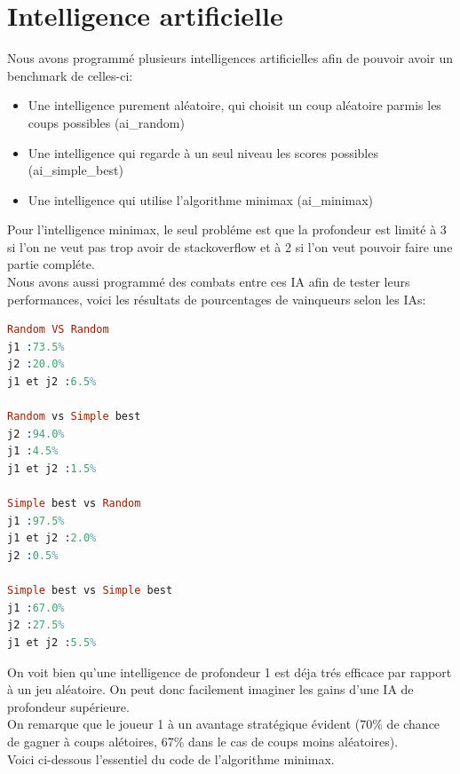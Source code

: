 \documentclass[11pt,a4paper,twoside,french,svgnames]{report}
\begin{document}
\section{Intelligence artificielle}
Nous avons programmé plusieurs intelligences artificielles afin de pouvoir avoir un benchmark de celles-ci:
\begin{itemize}
    \item Une intelligence purement aléatoire, qui choisit un coup aléatoire parmis les coups possibles (ai\_random)
    \item Une intelligence qui regarde à un seul niveau les scores possibles (ai\_simple_best)
    \item Une intelligence qui utilise l'algorithme minimax (ai\_minimax)
\end{itemize}

Pour l'intelligence minimax, le seul probléme est que la profondeur est limité à 3 si l'on ne veut pas trop avoir de stackoverflow et à 2 si l'on veut pouvoir faire une partie compléte.
\\
Nous avons aussi programmé des combats entre ces IA afin de tester leurs performances, voici les résultats de pourcentages de vainqueurs selon les IAs:

\begin{lstlisting}[language=prolog]
Random VS Random
j1 :73.5%
j2 :20.0%
j1 et j2 :6.5%

Random vs Simple best
j2 :94.0%
j1 :4.5%
j1 et j2 :1.5%

Simple best vs Random
j1 :97.5%
j1 et j2 :2.0%
j2 :0.5%

Simple best vs Simple best
j1 :67.0%
j2 :27.5%
j1 et j2 :5.5%
\end{lstlisting}

On voit bien qu'une intelligence de profondeur 1 est déja trés efficace par rapport à un jeu aléatoire. On peut donc facilement imaginer les gains d'une IA de profondeur supérieure.
\\

On remarque que le joueur 1 à un avantage stratégique évident (70\% de chance de gagner à coups alétoires, 67\% dans le cas de coups moins aléatoires).
\\

Voici ci-dessous l'essentiel du code de l'algorithme minimax.
\end{document}
